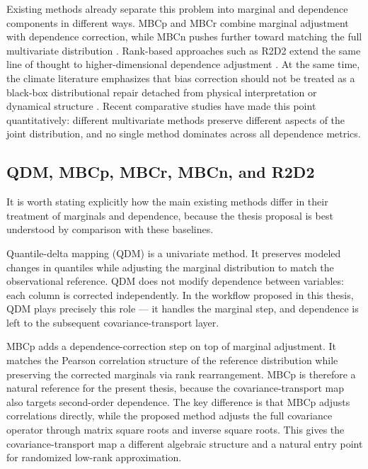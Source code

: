 Existing methods already separate this problem into marginal and dependence
components in different ways. MBCp and MBCr combine marginal adjustment with
dependence correction, while MBCn pushes further toward matching the full
multivariate distribution \cite{cannon2016mbc,cannon2018mbcn}. Rank-based
approaches such as R2D2 extend the same line of thought to higher-dimensional
dependence adjustment \cite{vrac2015ecbc,vrac2018r2d2}. At the same time, the
climate literature emphasizes that bias correction should not be treated as a
black-box distributional repair detached from physical interpretation or dynamical
structure \cite{maraun2016biasreview}. Recent comparative studies
\cite{francois2020multivariate} have made this point quantitatively: different
multivariate methods preserve different aspects of the joint distribution, and no
single method dominates across all dependence metrics.

\subsection{QDM, MBCp, MBCr, MBCn, and R2D2}

It is worth stating explicitly how the main existing methods differ in their
treatment of marginals and dependence, because the thesis proposal is best
understood by comparison with these baselines.

Quantile-delta mapping (QDM) \cite{cannon2015qdm} is a univariate method. It
preserves modeled changes in quantiles while adjusting the marginal distribution
to match the observational reference. QDM does not modify dependence between
variables: each column is corrected independently. In the workflow proposed in
this thesis, QDM plays precisely this role --- it handles the marginal step, and
dependence is left to the subsequent covariance-transport layer.

MBCp \cite{cannon2016mbc} adds a dependence-correction step on top of marginal
adjustment. It matches the Pearson correlation structure of the reference
distribution while preserving the corrected marginals via rank rearrangement.
MBCp is therefore a natural reference for the present thesis, because the
covariance-transport map also targets second-order dependence. The key difference
is that MBCp adjusts correlations directly, while the proposed method adjusts the
full covariance operator through matrix square roots and inverse square roots.
This gives the covariance-transport map a different algebraic structure and a
natural entry point for randomized low-rank approximation.

